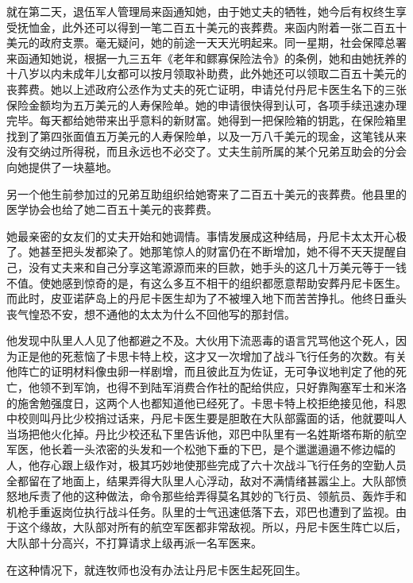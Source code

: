  


    就在第二天，退伍军人管理局来函通知她，由于她丈夫的牺牲，她今后有权终生享受抚恤金，此外还可以得到一笔二百五十美元的丧葬费。来函内附着一张二百五十美元的政府支票。毫无疑问，她的前途一天天光明起来。同一星期，社会保障总署来函通知她说，根据一九三五年《老年和鳏寡保险法令》的条例，她和由她抚养的十八岁以内未成年儿女都可以按月领取补助费，此外她还可以领取二百五十美元的丧葬费。她以上述政府公丞作为丈夫的死亡证明，申请兑付丹尼卡医生名下的三张保险金额均为五万美元的人寿保险单。她的申请很快得到认可，各项手续迅速办理完毕。每天都给她带来出乎意料的新财富。她得到一把保险箱的钥匙，在保险箱里找到了第四张面值五万美元的人寿保险单，以及一万八千美元的现金，这笔钱从来没有交纳过所得税，而且永远也不必交了。丈夫生前所属的某个兄弟互助会的分会向她提供了一块墓地。

    另一个他生前参加过的兄弟互助组织给她寄来了二百五十美元的丧葬费。他县里的医学协会也给了她二百五十美元的丧葬费。

    她最亲密的女友们的丈夫开始和她调情。事情发展成这种结局，丹尼卡太太开心极了。她甚至把头发都染了。她那笔惊人的财富仍在不断增加，她不得不天天提醒自己，没有丈夫来和自己分享这笔源源而来的巨款，她手头的这几十万美元等于一钱不值。使她感到惊奇的是，有这么多互不相干的组织都愿意帮助安葬丹尼卡医生。而此时，皮亚诺萨岛上的丹尼卡医生却为了不被埋入地下而苦苦挣扎。他终日垂头丧气惶恐不安，想不通他的太太为什么不回他写的那封信。

 


    他发现中队里人人见了他都避之不及。大伙用下流恶毒的语言咒骂他这个死人，因为正是他的死惹恼了卡思卡特上校，这才又一次增加了战斗飞行任务的次数。有关他阵亡的证明材料像虫卵一样剧增，而且彼此互为佐证，无可争议地判定了他的死亡，他领不到军饷，也得不到陆军消费合作社的配给供应，只好靠陶塞军士和米洛的施舍勉强度日，这两个人也都知道他已经死了。卡思卡特上校拒绝接见他，科恩中校则叫丹比少校捎过话来，丹尼卡医生要是胆敢在大队部露面的话，他就要叫人当场把他火化掉。丹比少校还私下里告诉他，邓巴中队里有一名姓斯塔布斯的航空军医，他长着一头浓密的头发和一个松弛下垂的下巴，是个邋邋遢遢不修边幅的人，他存心跟上级作对，极其巧妙地使那些完成了六十次战斗飞行任务的空勤人员全都留在了地面上，结果弄得大队里人心浮动，敌对不满情绪甚嚣尘上。大队部愤怒地斥责了他的这种做法，命令那些给弄得莫名其妙的飞行员、领航员、轰炸手和机枪手重返岗位执行战斗任务。队里的士气迅速低落下去，邓巴也遭到了监视。由于这个缘故，大队部对所有的航空军医都非常敌视。所以，丹尼卡医生阵亡以后，大队部十分高兴，不打算请求上级再派一名军医来。

    在这种情况下，就连牧师也没有办法让丹尼卡医生起死回生。

